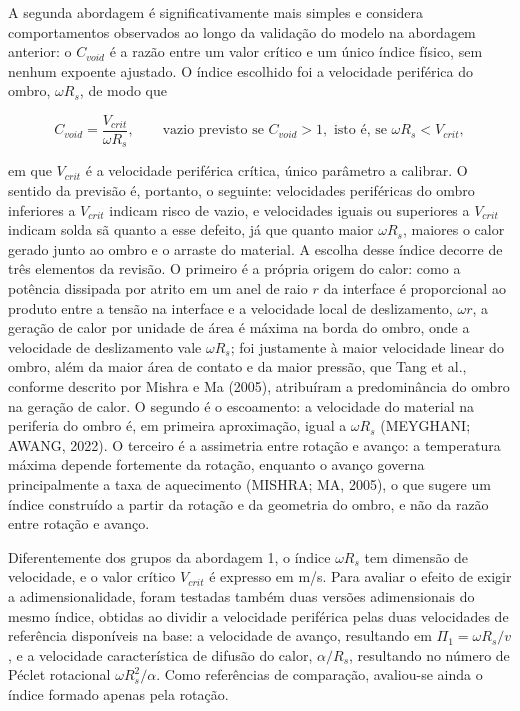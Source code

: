 \documentclass[12pt,openany]{report}
\begin{document}
A segunda abordagem é significativamente mais simples e considera comportamentos observados ao longo da validação do modelo na abordagem anterior: o $C_{void}$ é a razão entre um valor crítico e um único índice físico, sem nenhum expoente ajustado. O índice escolhido foi a velocidade periférica do ombro, $\omega R_s$, de modo que

\begin{equation}
C_{void} = \frac{V_{crit}}{\omega R_s}, \qquad \text{vazio previsto se } C_{void} > 1, \text{ isto é, se } \omega R_s < V_{crit},
\label{eq:cvoid_a}
\end{equation}

\noindent em que $V_{crit}$ é a velocidade periférica crítica, único parâmetro a calibrar. O sentido da previsão é, portanto, o seguinte: velocidades periféricas do ombro inferiores a $V_{crit}$ indicam risco de vazio, e velocidades iguais ou superiores a $V_{crit}$ indicam solda sã quanto a esse defeito, já que quanto maior $\omega R_s$, maiores o calor gerado junto ao ombro e o arraste do material. A escolha desse índice decorre de três elementos da revisão. O primeiro é a própria origem do calor: como a potência dissipada por atrito em um anel de raio $r$ da interface é proporcional ao produto entre a tensão na interface e a velocidade local de deslizamento, $\omega r$, a geração de calor por unidade de área é máxima na borda do ombro, onde a velocidade de deslizamento vale $\omega R_s$; foi justamente à maior velocidade linear do ombro, além da maior área de contato e da maior pressão, que Tang et al., conforme descrito por Mishra e Ma (2005), atribuíram a predominância do ombro na geração de calor. O segundo é o escoamento: a velocidade do material na periferia do ombro é, em primeira aproximação, igual a $\omega R_s$ (MEYGHANI; AWANG, 2022). O terceiro é a assimetria entre rotação e avanço: a temperatura máxima depende fortemente da rotação, enquanto o avanço governa principalmente a taxa de aquecimento (MISHRA; MA, 2005), o que sugere um índice construído a partir da rotação e da geometria do ombro, e não da razão entre rotação e avanço.

Diferentemente dos grupos da abordagem 1, o índice $\omega R_s$ tem dimensão de velocidade, e o valor crítico $V_{crit}$ é expresso em m/s. Para avaliar o efeito de exigir a adimensionalidade, foram testadas também duas versões adimensionais do mesmo índice, obtidas ao dividir a velocidade periférica pelas duas velocidades de referência disponíveis na base: a velocidade de avanço, resultando em $\Pi_1 = \omega R_s/v$, e a velocidade característica de difusão do calor, $\alpha/R_s$, resultando no número de Péclet rotacional $\omega R_{s}^{2}/\alpha$. Como referências de comparação, avaliou-se ainda o índice formado apenas pela rotação.
\end{document}
